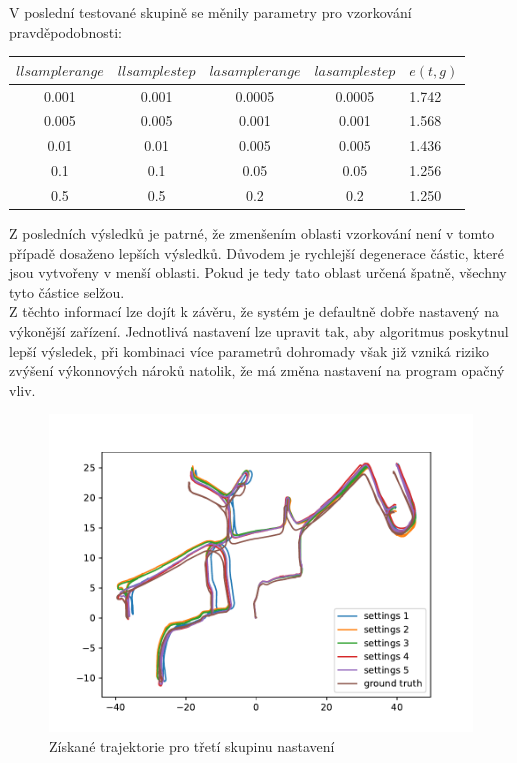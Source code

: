 \documentclass[12pt]{report}
\begin{document}
\noindent V poslední testované skupině se měnily parametry pro vzorkování pravděpodobnosti:
\begin{center}
	\begin{tabular}{cccc|p{1.5cm}}
		\bfseries $llsamplerange$  & \bfseries $llsamplestep$ & \bfseries $lasamplerange$ & \bfseries $lasamplestep$ & $e(t,g)$ \\ [2mm]
		\hline
		0.001 & 0.001 & 0.0005 & 0.0005 & 1.742 \\
		0.005 & 0.005 & 0.001 & 0.001 & 1.568 \\ 
		0.01 & 0.01 & 0.005 & 0.005 & 1.436 \\ 
		0.1 & 0.1 & 0.05 & 0.05 & 1.256 \\
		0.5 & 0.5 & 0.2 & 0.2 & 1.250\\
	\end{tabular}
\end{center}
Z posledních výsledků je patrné, že zmenšením oblasti vzorkování není v tomto případě dosaženo lepších výsledků. Důvodem je rychlejší degenerace částic, které jsou vytvořeny v menší oblasti. Pokud je tedy tato oblast určená špatně, všechny tyto částice selžou.\\
\indent Z těchto informací lze dojít k závěru, že systém je defaultně dobře nastavený na výkonější zařízení. Jednotlivá nastavení lze upravit tak, aby algoritmus poskytnul lepší výsledek, při kombinaci více parametrů dohromady však již vzniká riziko zvýšení výkonnových nároků natolik, že má změna nastavení na program opačný vliv.

\begin{figure}[!ht]
	\begin{center}
		\includegraphics[width=0.67\columnwidth]{imgs/gmapping3.pdf}
	\end{center}
	\caption{Získané trajektorie pro třetí skupinu nastavení}
	\label{fig:gmapping3}
\end{figure}
\end{document}
